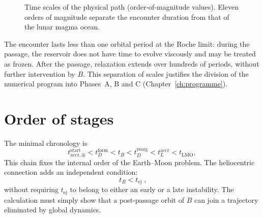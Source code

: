 \documentclass[11pt,a4paper,openany]{report}
\newcommand{\aR}{a_{\mathrm{Roche}}}
\begin{document}
\begin{figure}[htbp]
\centering
{}
\caption{Time scales of the physical path (order-of-magnitude values). Eleven orders of magnitude
separate the encounter duration from that of the lunar magma ocean.}
\label{fig:temps}
\end{figure}

\begin{ideephys}
The encounter lasts less than one orbital period at the Roche limit: during the passage, the
reservoir does not have time to evolve viscously and may be treated as frozen. After the passage,
relaxation extends over hundreds of periods, without further intervention by $B$. This separation
of scales justifies the division of the numerical program into Phases~A, B and C
(Chapter~\ref{ch:programme}).
\end{ideephys}

\section{Order of stages}

The minimal chronology is
\begin{equation}
t^{\mathrm{start}}_{\mathrm{accr},\oplus}<t^{\mathrm{form}}_D<t_B<t^{\mathrm{reorg}}_D
<t^{\mathrm{accr}}_L<t_{\mathrm{LMO}},
\label{eq:ordre}
\end{equation}
This chain fixes the internal order of the Earth--Moon problem. The heliocentric connection adds an
independent condition:
\begin{equation}
\boxed{\;t_B<t_{\mathrm{ej}}\;},
\label{eq:ordreB}
\end{equation}
without requiring $t_{\mathrm{ej}}$ to belong to either an early or a late instability. The calculation
must simply show that a post-passage orbit of $B$ can join a trajectory eliminated by global
dynamics.
\end{document}
